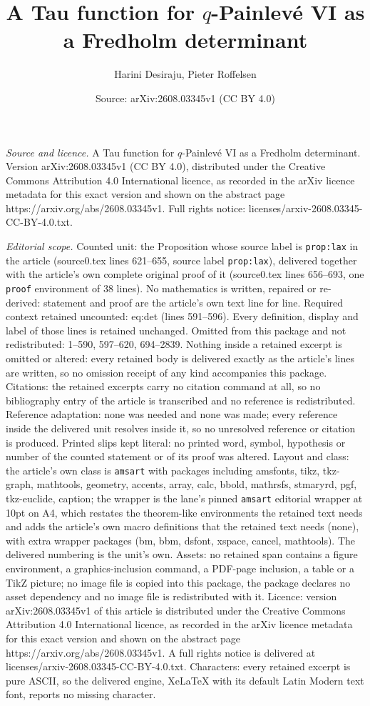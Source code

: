 \documentclass[10pt,a4paper]{amsart}
\title[A Tau function for $q$-Painlev\'e VI as a Fredholm determina]{A Tau function for $q$-Painlev\'e VI as a Fredholm determinant}
\author{Harini Desiraju, Pieter Roffelsen}
\date{Source: arXiv:2608.03345v1 (CC BY 4.0)}
\begin{document}
\maketitle

\noindent\emph{Source and licence.} A Tau function for $q$-Painlev\'e VI as a Fredholm determinant. Version arXiv:2608.03345v1 (CC BY 4.0), distributed under the Creative Commons Attribution 4.0 International licence, as recorded in the arXiv licence metadata for this exact version and shown on the abstract page https://arxiv.org/abs/2608.03345v1. Full rights notice: licenses/arxiv-2608.03345-CC-BY-4.0.txt.\par\smallskip

\noindent\textit{Editorial scope.} Counted unit: the Proposition whose source label is \texttt{prop:lax} in the article (source0.tex lines 621--655, source label \texttt{prop:lax}), delivered together with the article's own complete original proof of it (source0.tex lines 656--693, one \texttt{proof} environment of 38 lines). No mathematics is written, repaired or re-derived: statement and proof are the article's own text line for line. Required context retained uncounted: eq:det (lines 591--596). Every definition, display and label of those lines is retained unchanged. Omitted from this package and not redistributed: 1--590, 597--620, 694--2839. Nothing inside a retained excerpt is omitted or altered: every retained body is delivered exactly as the article's lines are written, so no omission receipt of any kind accompanies this package. Citations: the retained excerpts carry no citation command at all, so no bibliography entry of the article is transcribed and no reference is redistributed. Reference adaptation: none was needed and none was made; every reference inside the delivered unit resolves inside it, so no unresolved reference or citation is produced. Printed slips kept literal: no printed word, symbol, hypothesis or number of the counted statement or of its proof was altered. Layout and class: the article's own class is \texttt{amsart} with packages including amsfonts, tikz, tkz-graph, mathtools, geometry, accents, array, calc, bbold, mathrsfs, stmaryrd, pgf, tkz-euclide, caption; the wrapper is the lane's pinned \texttt{amsart} editorial wrapper at 10pt on A4, which restates the theorem-like environments the retained text needs and adds the article's own macro definitions that the retained text needs (none), with extra wrapper packages (bm, bbm, dsfont, xspace, cancel, mathtools). The delivered numbering is the unit's own. Assets: no retained span contains a figure environment, a graphics-inclusion command, a PDF-page inclusion, a table or a TikZ picture; no image file is copied into this package, the package declares no asset dependency and no image file is redistributed with it. Licence: version arXiv:2608.03345v1 of this article is distributed under the Creative Commons Attribution 4.0 International licence, as recorded in the arXiv licence metadata for this exact version and shown on the abstract page https://arxiv.org/abs/2608.03345v1. A full rights notice is delivered at licenses/arxiv-2608.03345-CC-BY-4.0.txt. Characters: every retained excerpt is pure ASCII, so the delivered engine, XeLaTeX with its default Latin Modern text font, reports no missing character.
\end{document}
